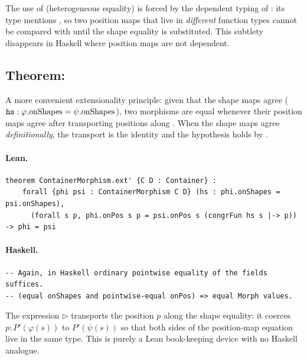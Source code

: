 \documentclass[11pt,a4paper]{article}
\begin{document}
\begin{fidelitynote}
The use of  (heterogeneous equality) is forced by the dependent typing
of : its type mentions , so two position maps that
live in \emph{different} function types cannot be compared with \lean{=} until
the shape equality is substituted.  This subtlety disappears in Haskell where
position maps are not dependent.
\end{fidelitynote}


\subsection{Theorem: }

\begin{thm}
A more convenient extensionality principle: given that the shape maps agree
($\texttt{hs} : \varphi.\mathrm{onShapes} = \psi.\mathrm{onShapes}$), two morphisms
are equal whenever their position maps agree after transporting positions along
.  When the shape maps agree \emph{definitionally}, the transport is
the identity and the hypothesis holds by .
\end{thm}

\paragraph{Lean.}
\begin{lstlisting}[style=lean]
theorem ContainerMorphism.ext' {C D : Container} :
    forall {phi psi : ContainerMorphism C D} (hs : phi.onShapes = psi.onShapes),
      (forall s p, phi.onPos s p = psi.onPos s (congrFun hs s |-> p)) -> phi = psi
\end{lstlisting}

\paragraph{Haskell.}
\begin{lstlisting}[style=haskell]
-- Again, in Haskell ordinary pointwise equality of the fields suffices.
-- (equal onShapes and pointwise-equal onPos) => equal Morph values.
\end{lstlisting}

\begin{fidelitynote}
The expression  $\triangleright$  transports the position $p$ along the
shape equality: it coerces $p : P'(\varphi(s))$ to $P'(\psi(s))$ so that both
sides of the position-map equation live in the same type.  This is purely a
Lean book-keeping device with no Haskell analogue.
\end{fidelitynote}
\end{document}
